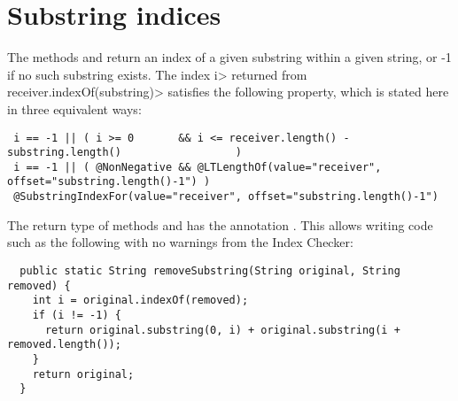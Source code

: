 \section{Substring indices\label{index-substringindex}}

The methods
and
return an index of a given substring within a given string, or -1 if no
such substring exists.  The index \<i> returned from
\<receiver.indexOf(substring)> satisfies the following property, which is
stated here in three equivalent ways:
\begin{Verbatim}
 i == -1 || ( i >= 0       && i <= receiver.length() - substring.length()                  )
 i == -1 || ( @NonNegative && @LTLengthOf(value="receiver", offset="substring.length()-1") )
 @SubstringIndexFor(value="receiver", offset="substring.length()-1")
\end{Verbatim}


The return type of methods 
and  has the annotation
.
This allows writing code such as the following with no warnings from the
Index Checker:

\begin{Verbatim}
  public static String removeSubstring(String original, String removed) {
    int i = original.indexOf(removed);
    if (i != -1) {
      return original.substring(0, i) + original.substring(i + removed.length());
    }
    return original;
  }
\end{Verbatim}



